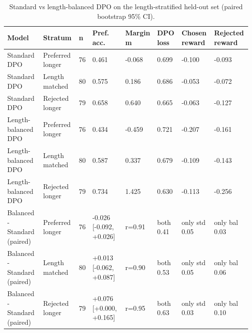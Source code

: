 \begin{table}[t]
\centering
\small
\caption{Standard vs length-balanced DPO on the length-stratified held-out set (paired bootstrap 95\% CI).}
\begin{tabular}{llllllll}
\toprule
Model & Stratum & n & Pref. acc. & Margin m & DPO loss & Chosen reward & Rejected reward \\
\midrule
Standard DPO & Preferred longer & 76 & 0.461 & -0.068 & 0.699 & -0.100 & -0.093 \\
Standard DPO & Length matched & 80 & 0.575 & 0.186 & 0.686 & -0.053 & -0.072 \\
Standard DPO & Rejected longer & 79 & 0.658 & 0.640 & 0.665 & -0.063 & -0.127 \\
Length-balanced DPO & Preferred longer & 76 & 0.434 & -0.459 & 0.721 & -0.207 & -0.161 \\
Length-balanced DPO & Length matched & 80 & 0.587 & 0.337 & 0.679 & -0.109 & -0.143 \\
Length-balanced DPO & Rejected longer & 79 & 0.734 & 1.425 & 0.630 & -0.113 & -0.256 \\
Balanced - Standard (paired) & Preferred longer & 76 & -0.026 [-0.092, +0.026] & r=0.91 & both 0.41 & only std 0.05 & only bal 0.03 \\
Balanced - Standard (paired) & Length matched & 80 & +0.013 [-0.062, +0.087] & r=0.90 & both 0.53 & only std 0.05 & only bal 0.06 \\
Balanced - Standard (paired) & Rejected longer & 79 & +0.076 [+0.000, +0.165] & r=0.95 & both 0.63 & only std 0.03 & only bal 0.10 \\
\bottomrule
\end{tabular}
\end{table}
